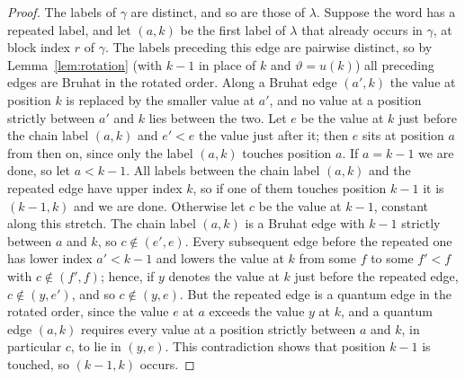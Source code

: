\documentclass[11pt]{article}
\begin{document}
\begin{proof}
The labels of $\gamma$ are distinct, and so are those of $\lambda$.
Suppose the word has a repeated label, and let $(a,k)$ be the first
label of $\lambda$ that already occurs in $\gamma$, at block index $r$
of $\gamma$. The labels preceding this edge are pairwise distinct, so
by Lemma~\ref{lem:rotation} (with $k-1$ in place of $k$ and
$\vartheta=u(k)$) all preceding edges are Bruhat in the rotated order.
Along a Bruhat edge $(a',k)$ the value at position $k$ is replaced by
the smaller value at $a'$, and no value at a position strictly between
$a'$ and $k$ lies between the two. Let $e$ be the value at $k$ just
before the chain label $(a,k)$ and $e'<e$ the value just after it;
then $e$ sits at position $a$ from then on, since only the label
$(a,k)$ touches position $a$. If $a=k-1$ we are done, so let $a<k-1$.
All labels between the chain label $(a,k)$ and the repeated edge have
upper index $k$, so if one of them touches position $k-1$ it is
$(k-1,k)$ and we are done. Otherwise let $c$ be the value at $k-1$,
constant along this stretch. The chain label $(a,k)$ is a Bruhat edge
with $k-1$ strictly between $a$ and $k$, so $c\notin(e',e)$. Every
subsequent edge before the repeated one has lower index $a'<k-1$ and
lowers the value at $k$ from some $f$ to some $f'<f$ with
$c\notin(f',f)$; hence, if $y$ denotes the value at $k$ just before
the repeated edge, $c\notin(y,e')$, and so $c\notin(y,e)$. But the repeated edge is a
quantum edge in the rotated order, since the value $e$ at $a$ exceeds
the value $y$ at $k$, and a quantum edge $(a,k)$ requires every value
at a position strictly between $a$ and $k$, in particular $c$, to lie
in $(y,e)$. This contradiction shows that position $k-1$ is touched,
so $(k-1,k)$ occurs.
\end{proof}
\end{document}
